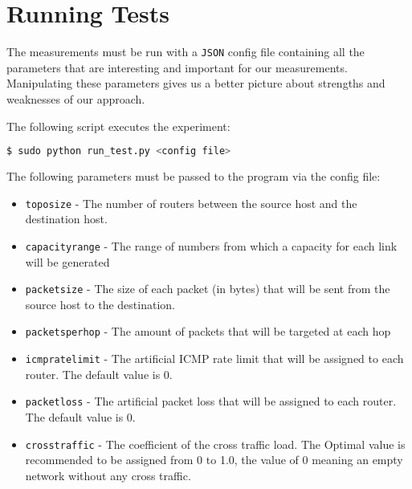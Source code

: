 \section{Running Tests}
The measurements must be run with a \texttt{JSON} config file containing all the parameters that are interesting and important for our measurements. Manipulating these parameters gives us a better picture about strengths and weaknesses of our approach.

The following script executes the experiment:
\begin{lstlisting}[language=bash]
  $ sudo python run_test.py <config file>
\end{lstlisting}

The following parameters must be passed to the program via the config file:
\begin{itemize}
	\item \texttt{topo\textunderscore size} - The number of routers between the source host and the destination host.
	\item \texttt{capacity\textunderscore range} - The range of numbers from which a capacity for each link will be generated
	\item \texttt{packet\textunderscore size} - The size of each packet (in bytes) that will be sent from the source host to the destination.
	\item \texttt{packets\textunderscore per\textunderscore hop} - The amount of packets that will be targeted at each hop
	\item \texttt{icmp\textunderscore ratelimit} - The artificial ICMP rate limit that will be assigned to each router. The default value is 0.
	\item \texttt{packet\textunderscore loss} - The artificial packet loss that will be assigned to each router. The default value is 0.
	\item \texttt{cross\textunderscore traffic} - The coefficient of the cross traffic load. The Optimal value is recommended to be assigned from 0 to 1.0, the value of 0 meaning an empty network without any cross traffic. 
\end{itemize}